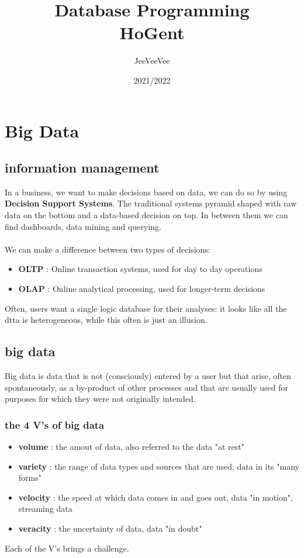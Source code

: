 \documentclass{report}
\title{Database Programming\\ HoGent}
\author{JeeVeeVee}
\date{2021/2022}
\begin{document}
	\maketitle
	\tableofcontents
	\chapter{Big Data}
		\section{information management}
			In a business, we want to make decisions based on data, we can do so by using \textbf{Decision Support Systems}. The traditional systems pyramid shaped with raw data on the bottom and a data-based decision on top. In between them we can find dashboards, data mining and querying.
			\\
			\\
			We can make a difference between two types of decisions: 
			\begin{itemize}
				\item \textbf{OLTP} : Online transaction systems, used for day to day operations
				\item \textbf{OLAP} : Online analytical processing, used for longer-term decisions
			\end{itemize}
			Often, users want a single logic database for their analyses: it looks like all the dtta is heterogeneous, while this often is just an illusion.
		\section{big data}
			Big data is data that is not (consciously) entered by a user but that arise, often spontaneously, as a by-product of other processes and that are usually used for purposes for which they were not originally intended.
			\subsection{the 4 V's of big data}
				\begin{itemize}
					\item \textbf{volume} : the amout of data, also referred to the data "at rest"
					\item \textbf{variety} : the range of data types and sources that are used, data in its "many forms"
					\item \textbf{velocity} : the speed at which data comes in and goes out, data "in motion", streaming data
					\item	\textbf{veracity} : the uncertainty of data, data "in doubt"
				\end{itemize}
				Each of the V's brings a challenge.
\end{document}
